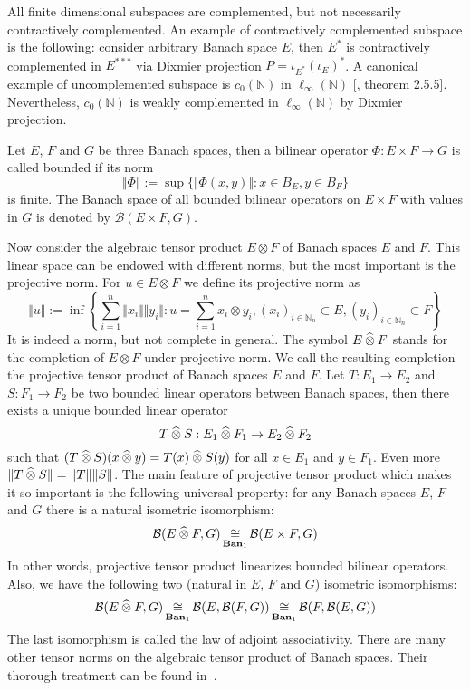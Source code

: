 All finite dimensional subspaces are complemented, but not necessarily
contractively complemented. An example of contractively complemented subspace is
the following: consider arbitrary Banach space $E$, then $E^*$ is contractively
complemented in $E^{***}$ via Dixmier projection $P=\iota_{E^*}{(\iota_E)}^*$. A
canonical example of uncomplemented subspace is $c_0(\mathbb{N})$ in
$\mathbb{\ell_\infty}(\mathbb{N})$ [\cite{KalAlbTopicsBanSpTh}, theorem 2.5.5].
Nevertheless, $c_0(\mathbb{N})$ is weakly complemented in
$\ell_\infty(\mathbb{N})$ by Dixmier projection.

Let $E$, $F$ and $G$ be three Banach spaces, then a bilinear operator
$\Phi:E\times F\to G$ is called bounded if its norm 
$$
\Vert \Phi\Vert:=\sup \{\Vert \Phi(x,y)\Vert:x\in B_E, y\in B_F \}
$$ 
is finite. 
The Banach space of all bounded bilinear operators on $E\times F$ with 
values in $G$ is denoted by $\mathcal{B}(E\times F,G)$.

Now consider the algebraic tensor product $E\otimes F$ of Banach spaces $E$ and
$F$. This linear space can be endowed with different norms, but the most
important is the projective norm. For $u\in E\otimes F$ we define its projective
norm as
$$
\Vert u\Vert
:=\inf\left \{
  \sum_{i=1}^n \Vert x_i\Vert\Vert y_i\Vert
  :u=\sum_{i=1}^n x_i\otimes y_i, 
  {(x_i)}_{i\in\mathbb{N}_n}\subset E, 
  {(y_i)}_{i\in\mathbb{N}_n}\subset F
\right \}
$$
It is indeed a norm, but not complete in general. The symbol $E\mathbin{\widehat{\otimes}} F$
stands for the completion of $E\otimes F$ under projective norm. We call the
resulting completion the projective tensor product of Banach spaces $E$ and $F$.
Let $T:E_1\to E_2$ and $S:F_1\to F_2$ be two bounded linear operators between
Banach spaces, then there exists a unique bounded linear operator 
$$
T\mathbin{\widehat{\otimes}} S:E_1\mathbin{\widehat{\otimes}} F_1\to E_2\mathbin{\widehat{\otimes}} F_2
$$ 
such that  $(T\mathbin{\widehat{\otimes}} S)(x\mathbin{\widehat{\otimes}} y)=T(x)\mathbin{\widehat{\otimes}} S(y)$ 
for all $x\in E_1$ and $y\in F_1$. 
Even more $\Vert T\mathbin{\widehat{\otimes}} S\Vert=\Vert T\Vert\Vert S\Vert$. 
The main feature of projective
tensor product which makes it so important is the following universal property:
for any Banach spaces $E$, $F$ and $G$ there is a natural isometric isomorphism:
$$
\mathcal{B}(E\mathbin{\widehat{\otimes}} F,G)\mathop{\mathbin{\cong}}\limits_{\mathbf{Ban}_1}\mathcal{B}(E\times F,G)
$$
In other words, projective tensor product linearizes bounded bilinear operators.
Also, we have the following two (natural in $E$, $F$ and $G$) isometric
isomorphisms:
$$
\mathcal{B}(E\mathbin{\widehat{\otimes}} F,G)
\mathop{\mathbin{\cong}}\limits_{\mathbf{Ban}_1}\mathcal{B}(E,\mathcal{B}(F,G))
\mathop{\mathbin{\cong}}\limits_{\mathbf{Ban}_1}\mathcal{B}(F,\mathcal{B}(E,G))
$$
The last isomorphism is called the law of adjoint associativity. There are many
other tensor norms on the algebraic tensor product of Banach spaces. Their
thorough treatment can be found in~\cite{DiestMetTheoryOfTensProd}.

